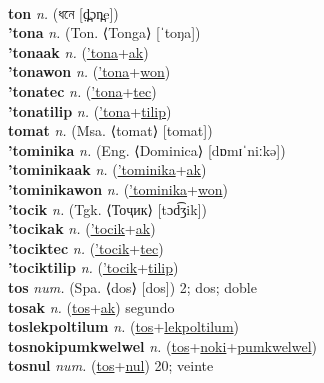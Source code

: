  \label{tolmiki} \\
\textbf{ton} \textit{n.} ({\bengali{}ধনে} [d̪̤ɔn̪e])
 \label{ton} \\
\textbf{'tona} \textit{n.} (Ton. ⟨Tonga⟩ [ˈtoŋa])
 \label{'tona} \\
\textbf{'tonaak} \textit{n.} (\hyperref['tona]{'tona}+\hyperref[ak]{ak})
 \label{'tonaak} \\
\textbf{'tonawon} \textit{n.} (\hyperref['tona]{'tona}+\hyperref[won]{won})
 \label{'tonawon} \\
\textbf{'tonatec} \textit{n.} (\hyperref['tona]{'tona}+\hyperref[tec]{tec})
 \label{'tonatec} \\
\textbf{'tonatilip} \textit{n.} (\hyperref['tona]{'tona}+\hyperref[tilip]{tilip})
 \label{'tonatilip} \\
\textbf{tomat} \textit{n.} (Msa. ⟨tomat⟩ [tomat])
 \label{tomat} \\
\textbf{'tominika} \textit{n.} (Eng. ⟨Dominica⟩ [dɒmɪˈniːkə])
 \label{'tominika} \\
\textbf{'tominikaak} \textit{n.} (\hyperref['tominika]{'tominika}+\hyperref[ak]{ak})
 \label{'tominikaak} \\
\textbf{'tominikawon} \textit{n.} (\hyperref['tominika]{'tominika}+\hyperref[won]{won})
 \label{'tominikawon} \\
\textbf{'tocik} \textit{n.} (Tgk. ⟨Тоҷик⟩ [tɔd͡ʒik])
 \label{'tocik} \\
\textbf{'tocikak} \textit{n.} (\hyperref['tocik]{'tocik}+\hyperref[ak]{ak})
 \label{'tocikak} \\
\textbf{'tociktec} \textit{n.} (\hyperref['tocik]{'tocik}+\hyperref[tec]{tec})
 \label{'tociktec} \\
\textbf{'tociktilip} \textit{n.} (\hyperref['tocik]{'tocik}+\hyperref[tilip]{tilip})
 \label{'tociktilip} \\
\textbf{tos} \textit{num.} (Spa. ⟨dos⟩ [dos])
2; dos; doble \label{tos} \\
\textbf{tosak} \textit{n.} (\hyperref[tos]{tos}+\hyperref[ak]{ak})
segundo \label{tosak} \\
\textbf{toslekpoltilum} \textit{n.} (\hyperref[tos]{tos}+\hyperref[lekpoltilum]{lekpoltilum})
 \label{toslekpoltilum} \\
\textbf{tosnokipumkwelwel} \textit{n.} (\hyperref[tos]{tos}+\hyperref[noki]{noki}+\hyperref[pumkwelwel]{pumkwelwel})
 \label{tosnokipumkwelwel} \\
\textbf{tosnul} \textit{num.} (\hyperref[tos]{tos}+\hyperref[nul]{nul})
20; veinte \label{tosnul} \\
